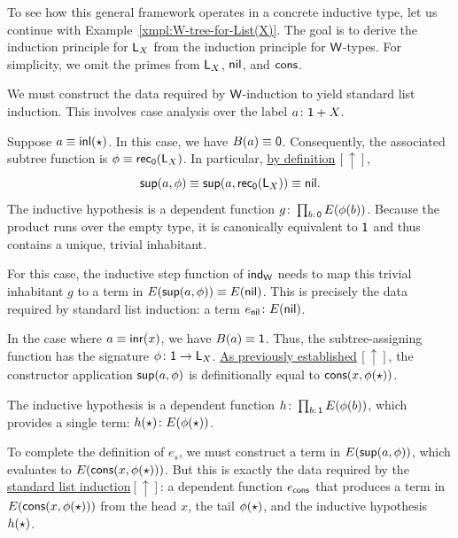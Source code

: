 \begin{xmpl}\label{xmpl:List(X)-induction-from-W-induction}
    To see how this general framework operates in a concrete inductive type, let us continue with Example~\ref{xmpl:W-tree-for-List(X)}. The goal is to derive the induction principle for $\mathsf{L}_X$ from the induction principle for $\mathsf{W}$-types. For simplicity, we omit the primes from $\mathsf{L}_X$, $\mathsf{nil}$, and $\mathsf{cons}$.

    We must construct the data required by $\mathsf{W}$-induction to yield standard list induction. This involves case analysis over the label $a\colon\fun1+X$.

    Suppose $a\equiv\mathsf{inl}({\mathsf{\star}})$. In this case, we have $B(a)\equiv\mathsf{0}$. Consequently, the associated subtree function is $\phi\equiv\mathsf{rec}_{\mathsf{0}}(\mathsf{L}_X)$. In particular, \hyperref[itm:list-from-W]{by definition$\,\scriptstyle[\uparrow]$},
     \[
     \mathsf{sup}(a,\phi)
     \equiv\mathsf{sup}(a,\mathsf{rec}_{\mathsf{0}}(\mathsf{L}_X))
     \equiv\mathsf{nil}.
     \]
    The inductive hypothesis is a dependent function $g\colon\prod_{b\colon\fun0}E(\phi(b))$. Because the product runs over the empty type, it is canonically equivalent to $\mathsf{1}$ and thus contains a unique, trivial inhabitant.

    For this case, the inductive step function of $\mathsf{ind}_{\mathsf{W}}$ needs to map this trivial inhabitant $g$ to a term in $E(\mathsf{sup}(a,\phi))\equiv E(\mathsf{nil})$. This is precisely the data required by standard list induction: a term $e_{\fun{nil}}\colon E(\fun{nil})$.

    In the case where $a\equiv\mathsf{inr}(x)$, we have $B(a)\equiv\mathsf{1}$. Thus, the subtree-assigning function has the signature $\phi\colon\fun1\to\fun L_X$. \hyperref[itm:list-from-W]{As previously established$\,\scriptstyle[\uparrow]$}, the constructor application $\mathsf{sup}(a,\phi)$ is definitionally equal to $\mathsf{cons}(x,\phi({\mathsf{\star}}))$.

    The inductive hypothesis is a dependent function $h\colon\prod_{b\colon\fun1}E(\phi(b))$, which provides a single term: $h(\fstar)\colon E(\phi(\fstar))$.

    To complete the definition of $e_s$, we must construct a term in $E(\mathsf{sup}(a,\phi))$, which evaluates to $E(\mathsf{cons}(x,\phi({\mathsf{\star}})))$. But this is exactly the data required by the \hyperref[itm:list-induction]{standard list induction$\scriptstyle[\uparrow]$}: a dependent function $e_{\mathsf{cons}}$ that produces a term in $E(\mathsf{cons}(x,\phi({\mathsf{\star}})))$ from the head $x$, the tail $\phi({\mathsf{\star}})$, and the inductive hypothesis~$h({\mathsf{\star}})$.


\end{xmpl}
